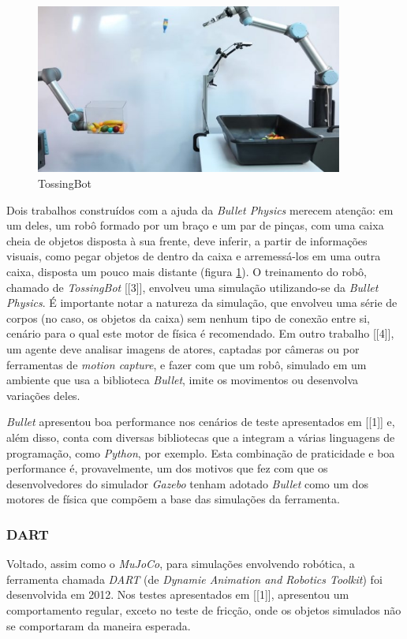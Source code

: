 \documentclass[cic,tc]{iiufrgs}
\begin{document}
\begin{figure}[h]
    \caption{TossingBot}
    \begin{center}
      \includegraphics[width=0.9\textwidth]{tossingbot.jpg}
    \end{center}
    \label{fig:tossingbot}
\end{figure}


Dois trabalhos construídos com a ajuda da \textit{Bullet Physics} merecem
atenção: em um deles, um robô formado por um braço e um par de pinças, com uma
caixa cheia de objetos disposta à sua frente, deve inferir, a partir de
informações visuais, como pegar objetos de dentro da caixa e arremessá-los em
uma outra caixa, disposta um pouco mais distante (figura \ref{fig:tossingbot}).
O treinamento do robô, chamado de \textit{TossingBot} [[3]], envolveu uma simulação
utilizando-se da \textit{Bullet Physics}. É importante notar a natureza da
simulação, que envolveu uma série de corpos (no caso, os objetos da caixa) sem
nenhum tipo de conexão entre si, cenário para o qual este motor de física é
recomendado. Em outro trabalho [[4]], um agente deve analisar imagens de atores,
captadas por câmeras ou por ferramentas de \textit{motion capture}, e fazer com
que um robô, simulado em um ambiente que usa a biblioteca \textit{Bullet},
imite os movimentos ou desenvolva variações deles.

\textit{Bullet} apresentou boa performance nos cenários de teste apresentados
em [[1]] e, além disso, conta com diversas bibliotecas que a integram a várias
linguagens de programação, como \textit{Python}, por exemplo. Esta combinação de
praticidade e boa performance é, provavelmente, um dos motivos que fez com que
os desenvolvedores do simulador \textit{Gazebo} tenham adotado \textit{Bullet}
como um dos motores de física que compõem a base das simulações da ferramenta.

\subsubsection{DART}
Voltado, assim como o \textit{MuJoCo}, para simulações envolvendo robótica,
a ferramenta chamada \textit{DART} (de \textit{Dynamie Animation and Robotics
Toolkit}) foi desenvolvida em 2012. Nos testes apresentados em [[1]], apresentou
um comportamento regular, exceto no teste de fricção, onde os objetos simulados
não se comportaram da maneira esperada.
\end{document}
